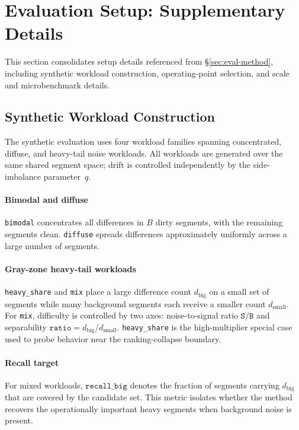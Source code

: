 \section{Evaluation Setup: Supplementary Details}
\label{sec:appendix-setup}

This section consolidates setup details referenced from
\S\ref{sec:eval-method}, including synthetic workload
construction, operating-point selection, and scale and
microbenchmark details.

\subsection{Synthetic Workload Construction}
\label{sec:appendix-workloads}

The synthetic evaluation uses four workload families spanning
concentrated, diffuse, and heavy-tail noise workloads.
All workloads are generated over the same shared segment space;
drift is controlled independently by the side-imbalance
parameter~$q$.

\paragraph{Bimodal and diffuse}
\texttt{bimodal} concentrates all differences in $B$ dirty
segments, with the remaining segments clean.
\texttt{diffuse} spreads differences approximately uniformly
across a large number of segments.

\paragraph{Gray-zone heavy-tail workloads}
\texttt{heavy\_share} and \texttt{mix} place a large difference
count $d_{\text{big}}$ on a small set of segments while many
background segments each receive a smaller count
$d_{\text{small}}$.
For \texttt{mix}, difficulty is controlled by two axes:
noise-to-signal ratio $\texttt{S/B}$ and separability
$\texttt{ratio}{=}d_{\text{big}}/d_{\text{small}}$.
\texttt{heavy\_share} is the high-multiplier special case used
to probe behavior near the ranking-collapse boundary.

\paragraph{Recall target}
For mixed workloads, $\texttt{recall\_big}$ denotes the
fraction of segments carrying $d_{\text{big}}$ that are
covered by the candidate set.
This metric isolates whether the method recovers the
operationally important heavy segments when background noise is
present.

